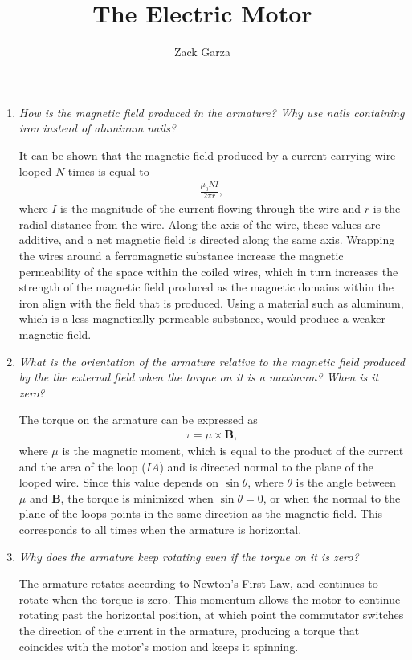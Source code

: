 \documentclass[a4paper,10pt]{report}
\title{The Electric Motor}
\author{Zack Garza}
\newcommand{\vb}[1]{\mathbf{#1}}		%
\begin{document}
\maketitle

\begin{enumerate}
	\item
		\textit{How is the magnetic field produced in the armature? Why use nails containing iron instead of aluminum nails?}

		It can be shown that the magnetic field produced by a current-carrying wire looped $N$ times is equal to
		\begin{align*}
			\frac{\mu_0 NI}{2\pi r},
		\end{align*}
		where $I$ is the magnitude of the current flowing through the wire and $r$ is the radial distance from the wire. Along the axis of the wire, these values are additive, and a net magnetic field is directed along the same axis. Wrapping the wires around a ferromagnetic substance increase the magnetic permeability of the space within the coiled wires, which in turn increases the strength of the magnetic field produced as the magnetic domains within the iron align with the field that is produced. Using a material such as aluminum, which is a less magnetically permeable substance, would produce a weaker magnetic field.

	\item
		\textit{What is the orientation of the armature relative to the magnetic field produced by the the external field when the torque on it is a maximum? When is it zero?}

		The torque on the armature can be expressed as
		\begin{align*}
			\tau = \mu \times \vb{B},
		\end{align*}
		where $\mu$ is the magnetic moment, which is equal to the product of the current and the area of the loop ($IA$) and is directed normal to the plane of the looped wire. Since this value depends on $\sin\theta$, where $\theta$ is the angle between $\mu$ and $\vb{B}$, the torque is minimized when $\sin\theta=0$, or when the normal to the plane of the loops points in the same direction as the magnetic field. This corresponds to all times when the armature is horizontal.

	\item
		\textit{Why does the armature keep rotating even if the torque on it is zero?}

		The armature rotates according to Newton's First Law, and continues to rotate when the torque is zero. This momentum allows the motor to continue rotating past the horizontal position, at which point the commutator switches the direction of the current in the armature, producing a torque that coincides with the motor's motion and keeps it spinning.


\end{enumerate}
\end{document}
